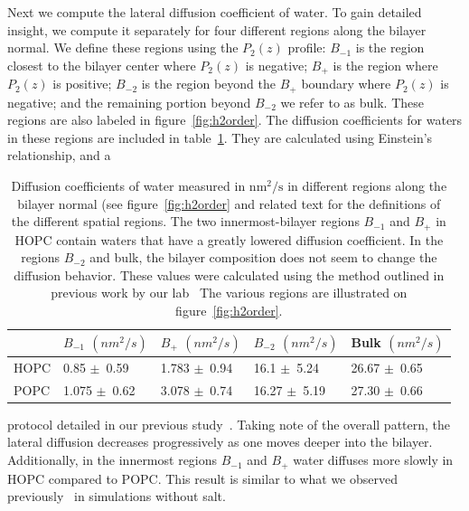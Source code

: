 \documentclass[12pt,openany,final]{book}
\newcommand{\PM}{$\pm$~}
\begin{document}
Next we compute the lateral diffusion coefficient of water. To gain detailed insight, we compute it 
separately for four different regions along the bilayer normal. We define these regions 
using the $P_2(z)$ profile: $B_{-1}$ is the region closest to the bilayer center where 
$P_2(z)$ is negative; $B_{+}$ is the region where $P_2(z)$ 
is positive; $B_{-2}$ is the region beyond the $B_{+}$ boundary where $P_2(z)$ is 
negative; and the remaining portion beyond $B_{-2}$ we refer to as bulk. 
These regions are also labeled in figure~\ref{fig:h2order}. The diffusion coefficients for waters 
in these regions are included in table~\ref{tab:diff}. They are calculated using Einstein's relationship, and a 
\begin{table}[t]
\caption[Diffusion coefficients of water measured in $\text{nm}^2/\text{s}$ in different regions along the bilayer normal.]{
Diffusion coefficients of water measured in $\text{nm}^2/\text{s}$ in different regions along the bilayer normal (see figure~\ref{fig:h2order} 
and related text for the definitions of the different spatial regions.
The two innermost-bilayer regions $B_{-1}$ and $B_+$ in HOPC contain waters that have a greatly lowered diffusion coefficient. In the regions $B_{-2}$ and bulk, 
the bilayer composition does not seem to change the diffusion behavior. These values were calculated using the method outlined in previous work by our lab~\cite{kruczek:2017:ether}
The various regions are illustrated on figure~\ref{fig:h2order}.
}
\label{tab:diff}
\begin{tabularx}{\textwidth}{X|X|X|X|X|}%
& $B_{-1}$ $(nm^2/s)$ & $B_+$ $(nm^2/s)$ & $B_{-2}$ $(nm^2/s)$ & Bulk $(nm^2/s)$\\ \hline
HOPC & 0.85 \PM 0.59 & 1.783 \PM 0.94 & 16.1 \PM 5.24 & 26.67 \PM 0.65 \\
POPC & 1.075 \PM 0.62 & 3.078 \PM 0.74 & 16.27 \PM 5.19 & 27.30 \PM 0.66 \\
\end{tabularx}
\end{table}
protocol detailed in our previous study~\cite{kruczek:2017:ether}. Taking note of the overall pattern, the 
lateral diffusion decreases progressively as one moves deeper into the bilayer. Additionally, in the innermost 
regions $B_{-1}$ and  $B_+$ water diffuses more slowly in HOPC compared to POPC. This result 
is similar to what we observed previously~\cite{kruczek:2017:ether} in simulations without salt.
\end{document}
